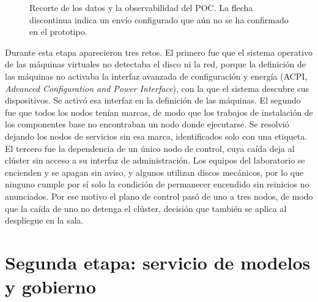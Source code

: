 \begin{figure}[H]
  \caption[Recorte de los datos y la observabilidad]{Recorte de los datos y la observabilidad del POC. La flecha discontinua indica un envío configurado que aún no se ha confirmado en el prototipo.}
  \label{fig:recorte-datos}
\end{figure}

Durante esta etapa aparecieron tres retos. El primero fue que el sistema operativo de las máquinas virtuales no detectaba el disco ni la red, porque la definición de las máquinas no activaba la interfaz avanzada de configuración y energía (ACPI, \emph{Advanced Configuration and Power Interface}), con la que el sistema descubre sus dispositivos. Se activó esa interfaz en la definición de las máquinas. El segundo fue que todos los nodos tenían marcas, de modo que los trabajos de instalación de los componentes base no encontraban un nodo donde ejecutarse. Se resolvió dejando los nodos de servicios sin esa marca, identificados solo con una etiqueta. El tercero fue la dependencia de un único nodo de control, cuya caída deja al clúster sin acceso a su interfaz de administración. Los equipos del laboratorio se encienden y se apagan sin aviso, y algunos utilizan discos mecánicos, por lo que ninguno cumple por sí solo la condición de permanecer encendido sin reinicios no anunciados. Por ese motivo el plano de control pasó de uno a tres nodos, de modo que la caída de uno no detenga el clúster, decisión que también se aplica al despliegue en la sala.

\section{Segunda etapa: servicio de modelos y gobierno}\label{sec:avance-etapa2}

